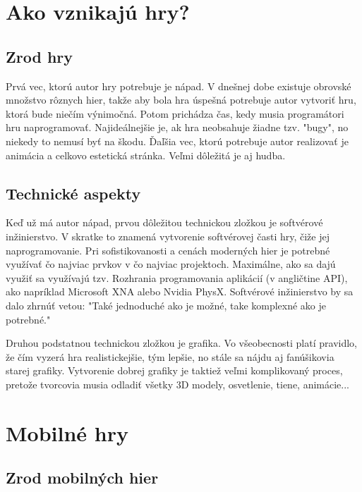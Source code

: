 \documentclass[10pt,twoside,slovak,a4paper]{article}
\begin{document}
\section{Ako vznikajú hry?} \label{pocitacove}

\subsection{Zrod hry}

Prvá vec, ktorú autor hry potrebuje je nápad. V dnešnej dobe existuje obrovské množstvo rôznych hier, takže aby bola hra úspešná potrebuje autor vytvoriť hru, ktorá bude niečím výnimočná. Potom prichádza čas, kedy musia programátori hru naprogramovať. Najideálnejšie je, ak hra neobsahuje žiadne tzv. "bugy", no niekedy to nemusí byť na škodu. Ďaľšia vec, ktorú potrebuje autor realizovať je animácia a celkovo estetická stránka. Veľmi dôležitá je aj hudba.

\subsection{Technické aspekty}

Keď už má autor nápad, prvou dôležitou technickou zložkou je softvérové inžinierstvo. V skratke to znamená vytvorenie softvérovej časti hry, čiže jej naprogramovanie. Pri sofistikovanosti a cenách moderných hier je potrebné využívať čo najviac prvkov v čo najviac projektoch. Maximálne, ako sa dajú využiť sa využívajú tzv. Rozhrania programovania aplikácií (v angličtine API), ako napríklad Microsoft XNA alebo Nvidia PhysX. Softvérové inžinierstvo by sa dalo zhrnúť vetou: "Také jednoduché ako je možné, take komplexné ako je potrebné."

Druhou podstatnou technickou zložkou je grafika. Vo všeobecnosti platí pravidlo, že čím vyzerá hra realistickejšie, tým lepšie, no stále sa nájdu aj fanúšikovia starej grafiky. Vytvorenie dobrej grafiky je taktiež veľmi komplikovaný proces, pretože tvorcovia musia odladiť všetky 3D modely, osvetlenie, tiene, animácie...~\cite{1} 

\section{Mobilné hry} \label{ina}

\subsection{Zrod mobilných hier}
\end{document}
